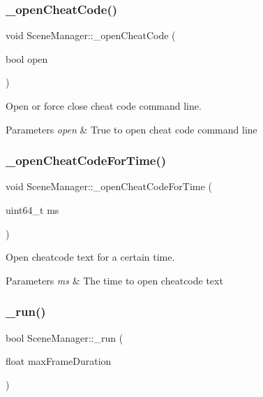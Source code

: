 \subsubsection{\texorpdfstring{\+\_\+open\+Cheat\+Code()}{\_openCheatCode()}}
{\footnotesize\ttfamily void Scene\+Manager\+::\+\_\+open\+Cheat\+Code (\begin{DoxyParamCaption}\item[{bool}]{open }\end{DoxyParamCaption})\hspace{0.3cm}{\ttfamily [protected]}}



Open or force close cheat code command line. 


\begin{DoxyParams}{Parameters}
{\em open} & True to open cheat code command line \\
\hline
\end{DoxyParams}
\mbox{\label{class_scene_manager_a5c09e7cb723f941b0fabcf1d97e6808d}} 
\subsubsection{\texorpdfstring{\+\_\+open\+Cheat\+Code\+For\+Time()}{\_openCheatCodeForTime()}}
{\footnotesize\ttfamily void Scene\+Manager\+::\+\_\+open\+Cheat\+Code\+For\+Time (\begin{DoxyParamCaption}\item[{uint64\+\_\+t}]{ms }\end{DoxyParamCaption})\hspace{0.3cm}{\ttfamily [protected]}}



Open cheatcode text for a certain time. 


\begin{DoxyParams}{Parameters}
{\em ms} & The time to open cheatcode text \\
\hline
\end{DoxyParams}
\mbox{\label{class_scene_manager_a551147ff34683483b9face928dd24564}} 
\subsubsection{\texorpdfstring{\+\_\+run()}{\_run()}}
{\footnotesize\ttfamily bool Scene\+Manager\+::\+\_\+run (\begin{DoxyParamCaption}\item[{float}]{max\+Frame\+Duration }\end{DoxyParamCaption})\hspace{0.3cm}{\ttfamily [protected]}}



